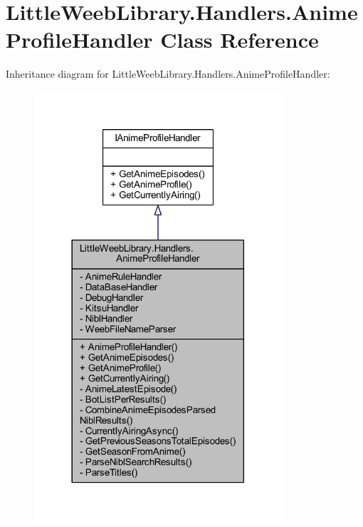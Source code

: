 \hypertarget{class_little_weeb_library_1_1_handlers_1_1_anime_profile_handler}{}\section{Little\+Weeb\+Library.\+Handlers.\+Anime\+Profile\+Handler Class Reference}
\label{class_little_weeb_library_1_1_handlers_1_1_anime_profile_handler}


Inheritance diagram for Little\+Weeb\+Library.\+Handlers.\+Anime\+Profile\+Handler\+:\nopagebreak
\begin{figure}[H]
\begin{center}
\leavevmode
\includegraphics[width=261pt]{class_little_weeb_library_1_1_handlers_1_1_anime_profile_handler__inherit__graph}
\end{center}
\end{figure}


